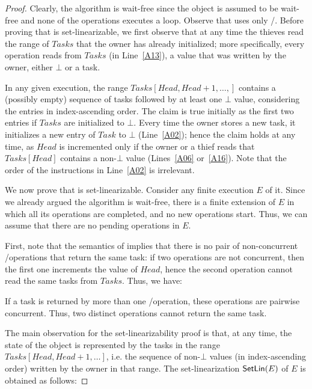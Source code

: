 \begin{proof}

Clearly, the algorithm is wait-free since the \MaxReg object is assumed to be wait-free and none of the operations executes a loop.  Observe that \Put uses only \R/\W.  Before proving that \WFWSM is set-linearizable, we first observe that at any time the thieves read the range of \(Tasks\) that the owner has already initialized; more specifically, every \Steal operation reads from \(Tasks\) (in Line~\ref{A13}), a value that was written by the owner, either \(\bot\) or a task.

In any given execution, the range \(Tasks[Head, Head+1, \hdots, ]\) contains a (possibly empty) sequence of tasks followed by at least one \(\bot\) value, considering the entries in index-ascending order. The claim is true initially as the first two entries if \(Tasks\) are initialized to \(\bot\).  Every time the owner stores a new task, it initializes a new entry of \(Task\) to \(\bot\) (Line~\ref{A02}); hence the claim holds at any time, as \(Head\) is incremented only if the owner or a thief reads that \(Tasks[Head]\) contains a non-\(\bot\) value (Lines~\ref{A06} or~\ref{A16}).  Note that the order of the instructions in Line~\ref{A02} is irrelevant.

We now prove that \WFWSM is set-linearizable. Consider any finite execution \(E\) of it. Since we already argued the algorithm is wait-free, there is a finite extension of \(E\) in which all its operations are completed, and no new operations start. Thus, we can assume that there are no pending operations in \(E\).

First, note that the semantics of \MaxW implies that there is no pair of non-concurrent \Take/\Steal operations that return the same task: if two operations are not concurrent, then the first one increments the value of \(Head\), hence the second operation cannot read the same tasks from \(Tasks\). Thus, we have:

\begin{remark}\label{remark-concurrency}
If a task is returned by more than one \Take/\Steal operation, these operations are pairwise concurrent.  Thus, two distinct \Take operations cannot return the same task.
\end{remark}


The main observation for the set-linearizability proof is that, at any time, the state of the object is represented by the tasks in the range \(Tasks[Head, Head+1, \hdots ]\), i.e. the sequence of non-\(\bot\) values (in index-ascending order) written by the owner in that range.  The set-linearization \({\sf \small SetLin}(E)\) of \(E\) is obtained as follows:


\end{proof}

